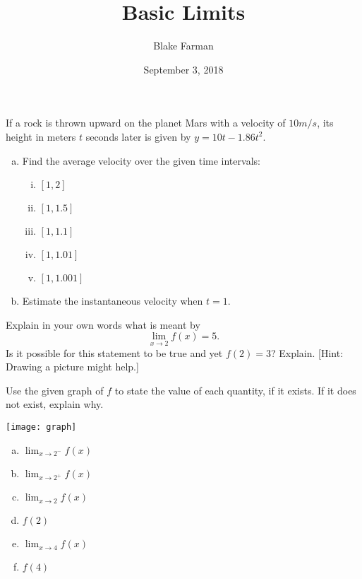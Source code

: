\documentclass[10pt]{amsart}
\title[Homework 2]{Basic Limits}
\date{September 3, 2018}
\author{Blake Farman}
\begin{document}
\maketitle

\makenameslot

\begin{thm}
  If a rock is thrown upward on the planet Mars with a velocity of \(10 m/s\), its height in meters \(t\) seconds later is given by \(y = 10t - 1.86t^2\).
  \begin{enumerate}[(a)]
  \item
    Find the average velocity over the given time intervals:
    \begin{enumerate}[(i)]
    \item
      \([1,2]\)
      \vspace{1in}
    \item
      \([1,1.5]\)
      \vspace{1in}
    \item
      \([1,1.1]\)
      \vspace{1in}
    \item
      \([1,1.01]\)
      \newpage
    \item
      \([1,1.001]\)
      \vspace{1in}
    \end{enumerate}
  \item
    Estimate the instantaneous velocity when \(t = 1\).
    \vspace{1in}
  \end{enumerate}
\end{thm}

\begin{thm}
  Explain in your own words what is meant by
  \[\lim_{x \to 2} f(x) = 5.\]
  Is it possible for this statement to be true and yet \(f(2) = 3\)?
  Explain.
  {[Hint: Drawing a picture might help.]}
\end{thm}

\vspace{2in}

\begin{thm}
  Use the given graph of \(f\) to state the value of each quantity, if it exists.
  If it does not exist, explain why.
  \begin{center}
    \texttt{[image: graph]}
  \end{center}
  \newpage
  \begin{enumerate}[(a)]
  \item
    \(\lim_{x \to 2^{-}} f(x)\)
    \vspace{1in}
  \item
    \(\lim_{x \to 2^{+}} f(x)\)
    \vspace{1in}
  \item
    \(\lim_{x \to 2} f(x)\)
    \vspace{1in}
  \item
    \(f(2)\)
    \vspace{1in}
  \item
    \(\lim_{x \to 4} f(x)\)
    \vspace{1in}
  \item
    \(f(4)\)
    \vspace{1in}
  \end{enumerate}
\end{thm}
\end{document}
